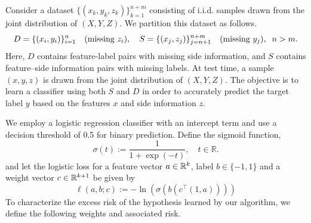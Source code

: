 Consider a dataset $\{(x_k, y_k, z_k)\}_{k=1}^{n+m}$ consisting of i.i.d. samples drawn from the joint distribution of $(X, Y, Z)$. We partition this dataset as follows.
\begin{equation}\label{eqn: partioned dataset}
    \begin{aligned}
        D = \{(x_i, y_i)\}_{i=1}^n \quad \text{(missing  $z_i$\text)}, \quad S = \{(x_j, z_j)\}_{j=n+1}^{n+m} \quad \text{(missing $y_j$)}, \;\; n > m.
    \end{aligned}
\end{equation}
Here, $D$ contains feature-label pairs with missing side information, and $S$ contains feature–side information pairs with missing labels.
At test time, a sample $(x, y, z)$ is drawn from the joint distribution of $(X, Y, Z)$. The objective is to learn a classifier using both $S$ and $D$ in order to accurately predict the target label $y$ based on the features $x$ and side information $z$.

We employ a logistic regression classifier with an intercept term and use a decision threshold of 0.5 for binary prediction. Define the sigmoid function,
\begin{equation*}
        \sigma(t) := \frac{1}{1 + \exp\left( -t \right)}, \quad t \in \mathbb{R}.
\end{equation*}
and let the logistic loss for a feature vector $a \in \mathbb{R}^k$, label $b \in \{-1,1\}$ and a weight vector $c \in \mathbb{R}^{k+1}$
be given by
\begin{equation}
\ell(a,b;c) := -\ln(\sigma(b(c^\top(1,a))))
\end{equation}
To characterize the excess risk of the hypothesis learned by our algorithm, we define the following weights and associated risk.

